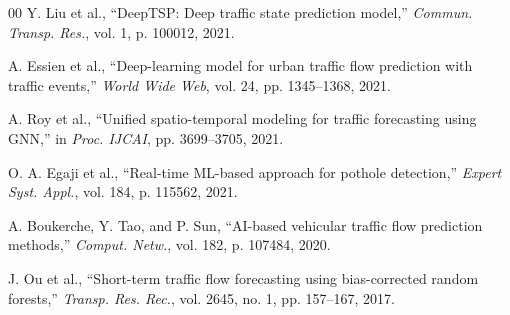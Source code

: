 \documentclass[conference]{IEEEtran}
\begin{document}
\begin{thebibliography}{00}
Y. Liu et al., ``DeepTSP: Deep traffic state prediction model,'' \textit{Commun. Transp. Res.}, vol. 1, p. 100012, 2021.

A. Essien et al., ``Deep-learning model for urban traffic flow prediction with traffic events,'' \textit{World Wide Web}, vol. 24, pp. 1345--1368, 2021.

A. Roy et al., ``Unified spatio-temporal modeling for traffic forecasting using GNN,'' in \textit{Proc. IJCAI}, pp. 3699--3705, 2021.

O. A. Egaji et al., ``Real-time ML-based approach for pothole detection,'' \textit{Expert Syst. Appl.}, vol. 184, p. 115562, 2021.

A. Boukerche, Y. Tao, and P. Sun, ``AI-based vehicular traffic flow prediction methods,'' \textit{Comput. Netw.}, vol. 182, p. 107484, 2020.

J. Ou et al., ``Short-term traffic flow forecasting using bias-corrected random forests,'' \textit{Transp. Res. Rec.}, vol. 2645, no. 1, pp. 157--167, 2017.
\end{thebibliography}
\end{document}
